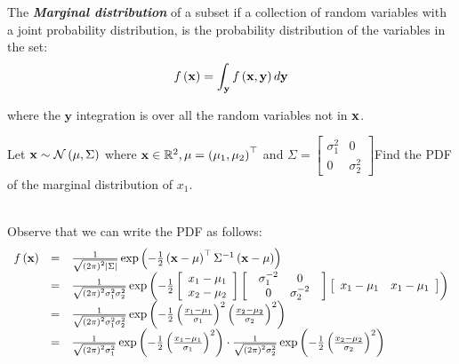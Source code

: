 \begin{definition}
The \textbf{\textit{Marginal distribution}} of a subset if a collection of random variables with a joint probability distribution, is the probability distribution of the variables in the set: $$f\left(\mathbf{x}\right)=\int_{\mathbf{y}}f\left(\mathbf{x},\mathbf{y}\right)d\mathbf{y}$$
\end{definition}
where the $\mathbf{y}$ integration is over all the random variables not in $\mathbf{x}$.

\begin{exercise}
Let $\mathbf{x}\sim \mathcal{N}\left(\mu,\Sigma\right)$ where $\mathbf{x}\in\mathbb{R}^2, \mu=\left(\mu_1,\mu_2\right)^\top$ and $\Sigma=\left[\begin{array}{cc}\sigma_1^2&0\\0&\sigma_2^2\end{array}\right]$Find the PDF of the marginal distribution of $x_1$.

~\\Observe that we can write the PDF as follows:
$$
\begin{array}{ccl}
	f\left(\mathbf{x}\right) & = & \frac{1}{\sqrt{\left(2\pi\right)^{2}\left|\Sigma\right|}}\exp\left(-\frac{1}{2}\left(\mathbf{x}-\mu\right)^{\top}\Sigma^{-1}\left(\mathbf{x}-\mu\right)\right)\\
	& = & \frac{1}{\sqrt{\left(2\pi\right)^{2}\sigma_{1}^{2}\sigma_{2}^{2}}}\exp\left(-\frac{1}{2}\left[\begin{array}{c}
		x_{1}-\mu_{1}\\
		x_{2}-\mu_{2}
	\end{array}\right]\left[\begin{array}{c}
		\begin{array}{cc}
			\sigma_{1}^{-2} & 0\\
			0 & \sigma_{2}^{-2}
	\end{array}\end{array}\right]\left[\begin{array}{cc}
		x_{1}-\mu_{1} & x_{1}-\mu_{1}\end{array}\right]\right)\\
	& = & \frac{1}{\sqrt{\left(2\pi\right)^{2}\sigma_{1}^{2}\sigma_{2}^{2}}}\exp\left(-\frac{1}{2}\left(\frac{x_{1}-\mu_{1}}{\sigma_{1}}\right)^{2}\left(\frac{x_{2}-\mu_{2}}{\sigma_{2}}\right)^{2}\right)\\
	& = & \frac{1}{\sqrt{\left(2\pi\right)^{2}\sigma_{1}^{2}}}\exp\left(-\frac{1}{2}\left(\frac{x_{1}-\mu_{1}}{\sigma_{1}}\right)^{2}\right)\cdot\frac{1}{\sqrt{\left(2\pi\right)^{2}\sigma_{2}^{2}}}\exp\left(-\frac{1}{2}\left(\frac{x_{2}-\mu_{2}}{\sigma_{2}}\right)^{2}\right)
\end{array}
$$


\end{exercise}
